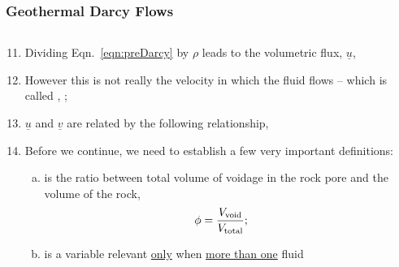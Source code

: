 \documentclass[10pt,compress,unknownkeysallowed]{beamer}
\begin{document}
\begin{frame}
 \frametitle{Geothermal Darcy Flows}
   \begin{columns}
      \begin{column}[c]{0.5\linewidth}
         \begin{enumerate}[1.]\setcounter{enumi}{10} \scriptsize
            \item <1-> Dividing Eqn.~\ref{eqn:preDarcy} by $\rho$ leads to the volumetric flux, $\underline{u}$,
            \item <2-> However this is not really the velocity in which the fluid flows -- which is called , ; 
            \item <3-> $\underline{u}$ and $\underline{v}$ are related by the following relationship,
            \item <4-> Before we continue, we need to establish a few very important definitions:
               \begin{enumerate}[(a)]\scriptsize
                  \item <4->  is the ratio between total volume of voidage in the rock pore and the volume of the rock,
                     \begin{equation}
                        \phi = \displaystyle\frac{V_{\text{void}}}{V_{\text{total}}};
                     \end{equation}
                  \item <5->  is a variable relevant \underline{only} when \underline{more than one} fluid 
               \end{enumerate}
         \end{enumerate}  
      \end{column}
      \begin{column}[c]{0.5\linewidth}

\end{column}
\end{columns}
\end{frame}
\end{document}
